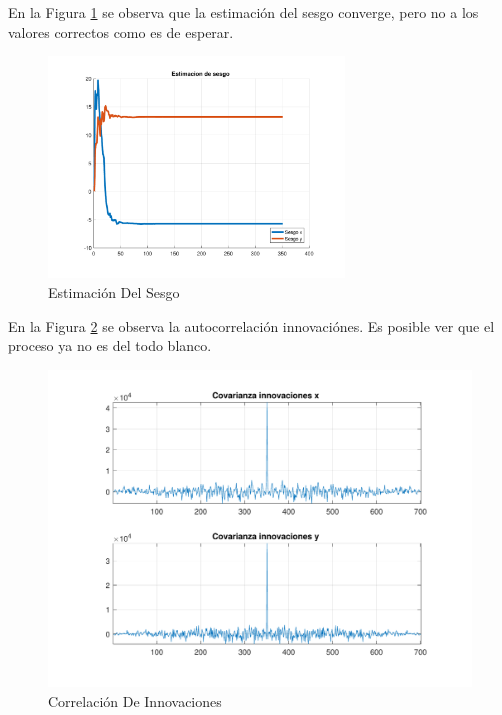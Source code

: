 	En la Figura \ref{fig:ej4c_bias} se observa que la estimación del sesgo converge, pero no a los valores correctos como es de esperar.
	
	\begin{figure}[H]
		\centering
		\includegraphics[width=0.7\textwidth,keepaspectratio]{Figuras/bias_ej4c.pdf}
		\caption{Estimación Del Sesgo}
		\label{fig:ej4c_bias}
	\end{figure}
	
	En la Figura \ref{fig:ej4c_cov} se observa la autocorrelación innovaciónes. Es posible ver que el proceso ya no es del todo blanco.
	
	\begin{figure}[H]
		\centering
		\includegraphics[width=1.0\textwidth,keepaspectratio]{Figuras/covinn_ej4c.pdf}
		\caption{Correlación De Innovaciones}
		\label{fig:ej4c_cov}
	\end{figure}
	

